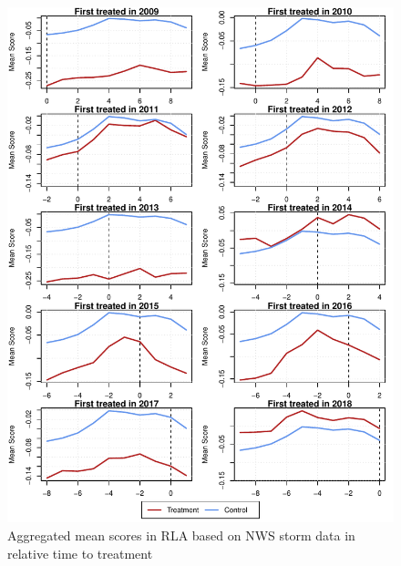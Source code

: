 \begin{figure}[!h]
	\centering
	\includegraphics[scale=1]{"../Code & Data/ParTrendsPlotRLAStorm.pdf"}
	\caption{Aggregated mean scores in RLA based on NWS storm data in relative time to treatment}
	\label{PreTrendsRLA}
\end{figure}



